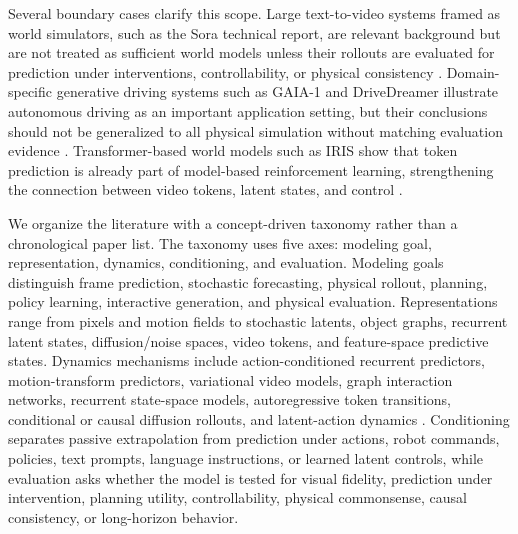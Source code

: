 Several boundary cases clarify this scope. Large text-to-video systems framed as world simulators, such as the Sora technical report, are relevant background but are not treated as sufficient world models unless their rollouts are evaluated for prediction under interventions, controllability, or physical consistency \cite{brooks2024sorareport}. Domain-specific generative driving systems such as GAIA-1 and DriveDreamer illustrate autonomous driving as an important application setting, but their conclusions should not be generalized to all physical simulation without matching evaluation evidence \cite{hu2023gaia1,wang2023drivedreamer}. Transformer-based world models such as IRIS show that token prediction is already part of model-based reinforcement learning, strengthening the connection between video tokens, latent states, and control \cite{micheli2023_iris_prov}.

We organize the literature with a concept-driven taxonomy rather than a chronological paper list. The taxonomy uses five axes: modeling goal, representation, dynamics, conditioning, and evaluation. Modeling goals distinguish frame prediction, stochastic forecasting, physical rollout, planning, policy learning, interactive generation, and physical evaluation. Representations range from pixels and motion fields to stochastic latents, object graphs, recurrent latent states, diffusion/noise spaces, video tokens, and feature-space predictive states. Dynamics mechanisms include action-conditioned recurrent predictors, motion-transform predictors, variational video models, graph interaction networks, recurrent state-space models, autoregressive token transitions, conditional or causal diffusion rollouts, and latent-action dynamics \cite{oh2015_action_conditional_video_prediction_prov,finn2016_physical_interaction_video_prediction_prov,babaeizadeh2018_sv2p_prov,battaglia2016_interaction_networks_prov,watters2017_visual_interaction_networks_prov,hafner2019_planet_prov,hafner2020_dreamer_prov,wu2024ivideogpt,alonso2024_diamond_prov,chen2024diffusion_forcing_prov,bruce2024_genie_prov}. Conditioning separates passive extrapolation from prediction under actions, robot commands, policies, text prompts, language instructions, or learned latent controls, while evaluation asks whether the model is tested for visual fidelity, prediction under intervention, planning utility, controllability, physical commonsense, causal consistency, or long-horizon behavior.

